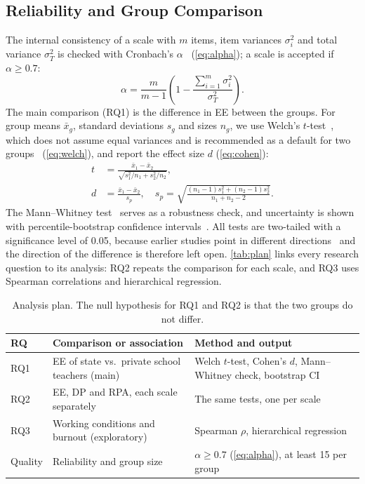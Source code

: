 \subsection{Reliability and Group Comparison}\label{sec:tests}
The internal consistency of a scale with $m$ items, item variances
$\sigma_i^2$ and total variance $\sigma_T^2$ is checked with Cronbach's
$\alpha$~\cite{cronbach1951alpha} (\autoref{eq:alpha}); a scale is accepted if $\alpha \ge 0.7$:
\begin{equation}
  \alpha = \frac{m}{m-1}\left(1 - \frac{\sum_{i=1}^{m}\sigma_i^{2}}{\sigma_{T}^{2}}\right).
  \label{eq:alpha}
\end{equation}
The main comparison (RQ1) is the difference in EE between the groups. For group
means $\bar{x}_g$, standard deviations $s_g$ and sizes $n_g$, we use Welch's
$t$-test~\cite{welch1947t}, which does not assume equal variances and is
recommended as a default for two groups~\cite{delacre2017welch}
(\autoref{eq:welch}), and report the effect size $d$ (\autoref{eq:cohen}):
\begin{align}
  t &= \frac{\bar{x}_1 - \bar{x}_2}{\sqrt{s_1^{2}/n_1 + s_2^{2}/n_2}}, \label{eq:welch}\\
  d &= \frac{\bar{x}_1 - \bar{x}_2}{s_p},\quad
  s_p = \sqrt{\tfrac{(n_1-1)s_1^{2} + (n_2-1)s_2^{2}}{n_1+n_2-2}}. \label{eq:cohen}
\end{align}
The Mann--Whitney test~\cite{mann1947u} serves as a robustness check, and
uncertainty is shown with percentile-bootstrap confidence intervals~\cite{efron1979bootstrap}.
All tests are two-tailed with a significance level of 0.05, because earlier
studies point in different directions~\cite{doss2018special,bahrami2019efl} and the
direction of the difference is therefore left open. \autoref{tab:plan} links every
research question to its analysis: RQ2 repeats the comparison for each scale, and RQ3 uses
Spearman correlations and hierarchical regression.

\begin{table}[b]
  \centering
  \caption{Analysis plan. The null hypothesis for RQ1 and RQ2 is that the two groups do not differ.}
  \label{tab:plan}
  \footnotesize
  \setlength{\tabcolsep}{3pt}
  \begin{tabular}{@{}lp{1.45in}p{1.5in}@{}}
    \toprule
    RQ & Comparison or association & Method and output \\
    \midrule
    RQ1 & EE of state vs.\ private school teachers (main) & Welch $t$-test, Cohen's $d$, Mann--Whitney check, bootstrap CI \\
    RQ2 & EE, DP and RPA, each scale separately & The same tests, one per scale \\
    RQ3 & Working conditions and burnout (exploratory) & Spearman $\rho$, hierarchical regression \\
    Quality & Reliability and group size & $\alpha \ge 0.7$ (\autoref{eq:alpha}), at least 15 per group \\
    \bottomrule
  \end{tabular}
\end{table}

